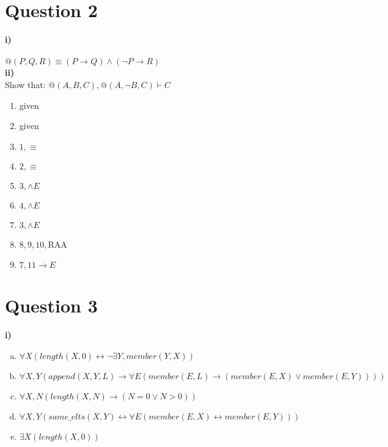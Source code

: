 \documentclass[12pt, a4paper]{article}
\begin{document}
\section*{Question 2}
\noindent \textbf{i)}\\\\
$@(P,Q,R) \equiv (P \longrightarrow Q) \wedge (\neg P \longrightarrow R)$\\

\noindent \textbf{ii)}\\

\noindent\textnormal{Show that:  }$@(A,B,C), @(A,\neg B, C) \vdash C$


\begin{enumerate}
\item {} given
\item {} given
\item {} $1, \equiv$
\item {} $2, \equiv$
\item {} $3, \wedge E$
\item {} $4, \wedge E$
\item {} $3, \wedge E$

\newpage



\item {} $8,9,10,$RAA
\item {} $7, 11 \longrightarrow E$
\end{enumerate}

\section*{Question 3}
\noindent \textbf{i)}
\begin{enumerate}[a.]
\item $\forall X ( length(X, 0) \longleftrightarrow \neg \exists Y,  member(Y, X))$
\item $\forall X,Y ( append(X,Y,L) \longrightarrow \forall E ( member(E,L) \longrightarrow ( member(E,X) \vee member(E,Y))))$
\item $\forall X,N ( length(X, N) \longrightarrow ( N=0 \vee N > 0))$
\item $\forall X,Y ( same\_elts(X,Y) \longleftrightarrow \forall E ( member(E,X) \longleftrightarrow member(E,Y)))$
\item $\exists X (length(X,0))$
\end{enumerate}
\end{document}
